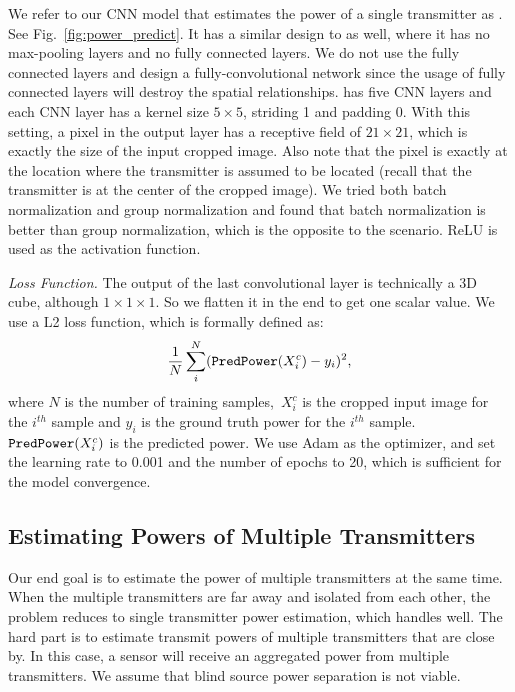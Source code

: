 We refer to our CNN model that estimates the power of a single transmitter as \power.
See Fig.~\ref{fig:power_predict}.
It has a similar design to \imgimg as well, where it has no max-pooling layers and no fully connected layers.
We do not use the fully connected layers and design a fully-convolutional network since the usage of fully connected layers will destroy the spatial relationships.
\power has five CNN layers and each CNN layer has a kernel size $5\times5$, striding 1 and padding 0.
With this setting, a pixel in the output layer has a receptive field of $21\times 21$, which is exactly the size of the input cropped image. Also note that the pixel is exactly at the location where the transmitter is assumed to be located (recall that the transmitter is at the center of the cropped image).
We tried both batch normalization and group normalization and found that batch normalization is better than group normalization, which is the opposite to the \imgimg scenario.
ReLU is used as the activation function.

{\em Loss Function.} The output of the last convolutional layer is technically a 3D cube, although $1 \times 1 \times 1$. So we flatten it in the end to get one scalar value.
We use a L2 loss function, which is formally defined as:
\begin{equation}
 \frac{1}{N} \sum_{i}^{N} ({\texttt{PredPower}}(X^c_{i}) - y_i)^2,
\end{equation}
where $N$ is the number of training samples,~$X^c_{i}$ is the cropped input image for the $i^{th}$ sample and $y_i$ is the ground truth power for the $i^{th}$ sample.
${\texttt{PredPower}}(X^c_{i})$ is the predicted power.
We use Adam as the optimizer, and set the learning rate to 0.001 and the number of epochs to 20, which is sufficient for the model convergence.

\subsection{Estimating Powers of Multiple Transmitters}
Our end goal is to estimate the power of multiple transmitters at the same time. 
When the multiple transmitters are far away and isolated from each other, the problem reduces to single transmitter power estimation, which \power handles well.
The hard part is to estimate transmit powers of multiple transmitters that are close by. 
In this case, a sensor will receive an aggregated power from multiple transmitters. We assume that blind source power separation is not viable. 

